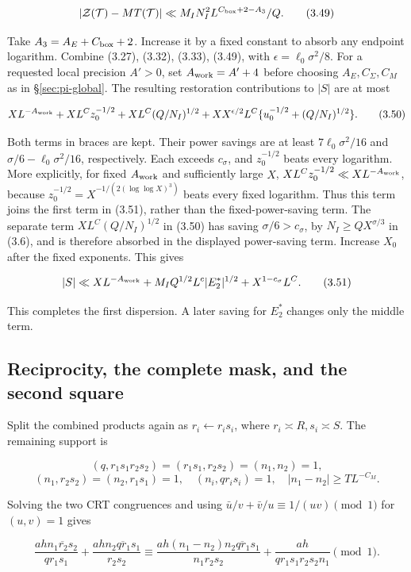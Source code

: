 \[
|\mathcal Z(\mathcal T)-MT(\mathcal T)|
 \ll M_IN_I^2L^{C_{\rm box}+2-A_3}/Q.
\tag{3.49}
\]

Take $A_3=A_E+C_{\rm box}+2$.
Increase it by a fixed constant to absorb any endpoint logarithm.
Combine (3.27), (3.32), (3.33), (3.49), with $\epsilon=\ell_0\sigma^2/8$.
For a requested local precision $A'>0$, set $A_{\rm work}=A'+4$
before choosing $A_E,C_\Sigma,C_M$ as in \S\ref{sec:pi-global}.
The resulting restoration contributions to $|S|$ are at most

\[
XL^{-A_{\rm work}}+XL^Cz_0^{-1/2}
 +XL^C(Q/N_I)^{1/2}
 +XX^{\epsilon/2}L^C\{u_0^{-1/2}+(Q/N_I)^{1/2}\}.
\tag{3.50}
\]

Both terms in braces are kept.
Their power savings are at least $7\ell_0\sigma^2/16$ and
$\sigma/6-\ell_0\sigma^2/16$, respectively.
Each exceeds $c_\sigma$, and $z_0^{-1/2}$ beats every logarithm.
More explicitly, for fixed $A_{\rm work}$ and sufficiently large $X$,
$XL^Cz_0^{-1/2}\ll XL^{-A_{\rm work}}$, because
$z_0^{-1/2}=X^{-1/(2(\log\log X)^3)}$ beats every fixed logarithm.
Thus this term joins the first term in (3.51), rather than the
fixed-power-saving term.
The separate term $XL^C(Q/N_I)^{1/2}$ in (3.50) has saving
$\sigma/6>c_\sigma$, by $N_I\ge QX^{\sigma/3}$ in (3.6),
and is therefore absorbed in the displayed power-saving term.
Increase $X_0$ after the fixed exponents. This gives

\[
|S|\ll XL^{-A_{\rm work}}
      +M_IQ^{1/2}L^c|E_2^*|^{1/2}+X^{1-c_\sigma}L^C.
\tag{3.51}
\]

This completes the first dispersion.
A later saving for $E_2^*$ changes only the middle term.

\subsection{Reciprocity, the complete mask, and the second square}

Split the combined products again as $r_i\leftarrow r_is_i$, where
$r_i\asymp R,s_i\asymp S$. The remaining support is

\[
(q,r_1s_1r_2s_2)=(r_1s_1,r_2s_2)=(n_1,n_2)=1,
\]
\[
(n_1,r_2s_2)=(n_2,r_1s_1)=1,
\quad(n_i,qr_is_i)=1,
\quad |n_1-n_2|\ge TL^{-C_M}.
\tag{3.52}
\]

Solving the two CRT congruences and using
$\bar u/v+\bar v/u\equiv1/(uv)\pmod1$ for $(u,v)=1$ gives

\[
\frac{ah\overline{n_1r_2s_2}}{qr_1s_1}
 +\frac{ah\overline{n_2qr_1s_1}}{r_2s_2}
 \equiv\frac{ah(n_1-n_2)\overline{n_2qr_1s_1}}{n_1r_2s_2}
       +\frac{ah}{qr_1s_1r_2s_2n_1}\pmod1.
\tag{3.53}
\]

